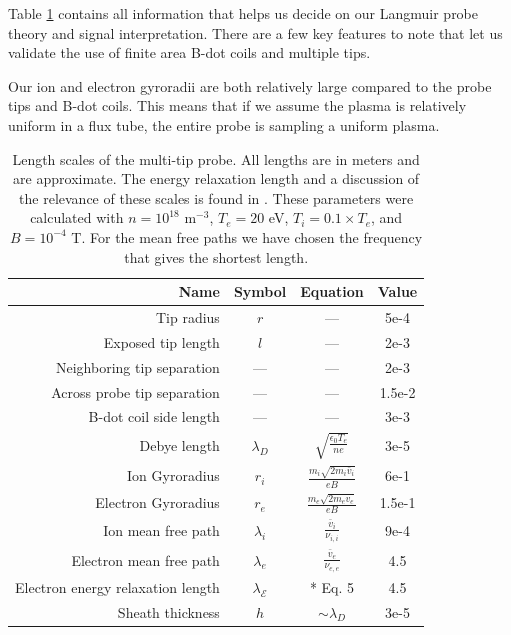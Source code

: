 Table \ref{tab:multitip_length_scales} contains all information that helps us decide on our Langmuir probe theory and signal interpretation. There are a few key features to note that let us validate the use of finite area B-dot coils and multiple tips.

Our ion and electron gyroradii are both relatively large compared to the probe tips and B-dot coils. This means that if we assume the plasma is relatively uniform in a flux tube, the entire probe is sampling a uniform plasma. %

\begin{table}
\begin{center}
\begin{tabular}{|r|c|c|c|}
    \hline
    Name & Symbol & Equation & Value \\
    \hline\hline
    Tip radius & $r$ & --- & 5e-4 \\
    \hline
    Exposed tip length & $l$ & --- & 2e-3 \\
    \hline
    Neighboring tip separation & --- & --- & 2e-3 \\
    \hline
    Across probe tip separation & --- & --- & 1.5e-2 \\
    \hline
    B-dot coil side length & --- & --- & 3e-3 \\
    \hline
    Debye length & $\lambda_D$ & $\sqrt{\frac{\epsilon_0 T_e}{n e}}$ & 3e-5 \\
    \hline
    Ion Gyroradius & $r_i$ & $\frac{m_i \sqrt{2 m_i \bar{v}_i}}{e B}$ & 6e-1 \\
    \hline
    Electron Gyroradius & $r_e$ & $\frac{m_e \sqrt{2 m_e \bar{v}_e}}{e B}$ & 1.5e-1 \\
    \hline
    Ion mean free path & $\lambda_i$ & $\frac{\bar{v}_i}{\nu_{i,i}}$ & 9e-4 \\
    \hline
    Electron mean free path & $\lambda_e$ & $\frac{\bar{v}_e}{\nu_{e,e}}$ & 4.5 \\
    \hline
    Electron energy relaxation length & $\lambda_\mathcal{E}$ & * Eq. 5 & 4.5 \\
    \hline
    Sheath thickness & $h$ & $\sim \lambda_D$ & 3e-5 \\
    \hline
\end{tabular}
\end{center}
\caption[*Multi-tip Langmuir Probe Length Scales]{Length scales of the multi-tip probe. All lengths are in meters and are approximate. The energy relaxation length and a discussion of the relevance of these scales is found in \cite{Demidov_Ratynskaia_Rypdal_2002}. These parameters were calculated with $n = 10^{18}$ m$^{-3}$, $T_e = 20$ eV, $T_i = 0.1 \times T_e$, and $B = 10^{-4}$ T. For the mean free paths we have chosen the frequency that gives the shortest length.}
\label{tab:multitip_length_scales}
\end{table}

